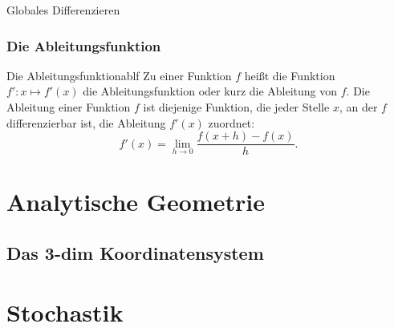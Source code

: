 \documentclass[a4paper]{report}
\begin{document}
\begin{section}{Globales Differenzieren}
\subsection{Die Ableitungsfunktion}
\begin{defi}{Die Ableitungsfunktion}{ablf}
    Zu einer Funktion $f$ heißt die Funktion $f': x \mapsto f'(x)$ die Ableitungsfunktion oder kurz die Ableitung von $f$. Die Ableitung einer Funktion $f$ ist diejenige Funktion, die jeder Stelle $x$, an der $f$ differenzierbar ist, die Ableitung $f'(x)$ zuordnet:
$$f'(x)=\lim_{h\rightarrow 0} \dfrac{f(x + h) - f(x)}{h}.$$ 

\end{defi}

\end{section}
\chapter{Analytische Geometrie}
\section{Das 3-dim Koordinatensystem}
\chapter{Stochastik}
\printindex
\end{document}
